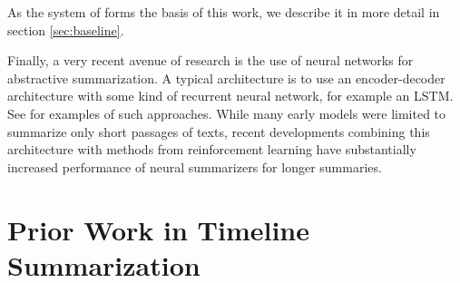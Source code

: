 \documentclass[a4paper,BCOR=10mm]{report}
\numberwithin{lemma}{chapter}
\numberwithin{definition}{chapter}
\begin{document}
As the system of \citet{banerjee} forms the basis of this work, we describe it in more detail in section \ref{sec:baseline}.



%


Finally, a very recent avenue of research is the use of neural networks for abstractive summarization. A typical architecture is to use an encoder-decoder architecture with some kind of recurrent neural network, for example an LSTM. See \citet{nallapati, rush} for examples of such approaches.
While many early models were limited to summarize only short passages of texts, recent developments combining this architecture with methods from reinforcement learning have substantially increased performance of neural summarizers for longer summaries. \citep{paulus}



\section{Prior Work in Timeline Summarization} \label{sec:prior-work-tl} 
\end{document}
